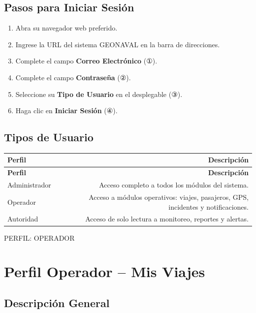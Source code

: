 \documentclass[12pt,a4paper]{article}
\newcommand{\perfilbanner}[1]{%
  \vspace{1em}%
  \noindent\colorbox{navyblue}{\parbox{\linewidth}{\centering\large\bfseries\color{white}\strut #1\strut}}%
  \vspace{0.5em}%
}
\begin{document}
\subsection{Pasos para Iniciar Sesión}

\begin{enumerate}[leftmargin=1.5em]
  \item Abra su navegador web preferido.
  \item Ingrese la URL del sistema GEONAVAL en la barra de direcciones.
  \item Complete el campo \textbf{Correo Electrónico} (①).
  \item Complete el campo \textbf{Contraseña} (②).
  \item Seleccione su \textbf{Tipo de Usuario} en el desplegable (③).
  \item Haga clic en \textbf{Iniciar Sesión} (④).
\end{enumerate}

\subsection{Tipos de Usuario}

\begin{longtable}{LR}
  \toprule
  \textbf{Perfil} & \textbf{Descripción} \\
  \midrule
  \endfirsthead
  \toprule
  \textbf{Perfil} & \textbf{Descripción} \\
  \midrule
  \endhead
  \bottomrule
  \endfoot
  Administrador & Acceso completo a todos los módulos del sistema. \\[4pt]
  Operador      & Acceso a módulos operativos: viajes, pasajeros, GPS, incidentes y notificaciones. \\[4pt]
  Autoridad     & Acceso de solo lectura a monitoreo, reportes y alertas. \\
\end{longtable}

\perfilbanner{PERFIL: OPERADOR}

\section{Perfil Operador -- Mis Viajes}

\subsection{Descripción General}
\end{document}
